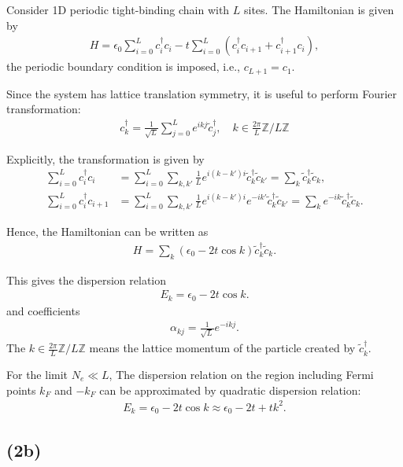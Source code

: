 \documentclass[a4paper,11pt]{article}
\begin{document}
Consider 1D periodic tight-binding chain with $L$ sites. The Hamiltonian is given by
\begin{eqnarray}
  H = \epsilon_0\sum_{i=0}^{L} c_i^\dagger c_i - t \sum_{i=0}^{L} (c_i^\dagger c_{i+1} + c_{i+1}^\dagger c_i),
\end{eqnarray}
the periodic boundary condition is imposed, i.e., $c_{L+1} = c_1$. 

Since the system has lattice translation symmetry, it is useful to perform Fourier transformation:
\begin{eqnarray}
  c_k^\dagger = \frac{1}{\sqrt{L}} \sum_{j=0}^{L} e^{ikj} \tilde{c}_j^\dagger, \quad k \in \frac{2\pi}{L}\mathbb{Z}/L\mathbb{Z}
\end{eqnarray}

Explicitly, the transformation is given by
\begin{align}
  \sum_{i=0}^{L} c_i^\dagger c_i &= \sum_{i=0}^{L} \sum_{k, k'} \frac{1}{L} e^{i(k-k')i} \tilde{c}_k^\dagger \tilde{c}_{k'} = \sum_{k} \tilde{c}_k^\dagger \tilde{c}_k,\\
  \sum_{i=0}^{L} c_i^\dagger c_{i+1} &= \sum_{i=0}^{L} \sum_{k, k'} \frac{1}{L} e^{i(k-k')i} e^{-ik'} \tilde{c}_k^\dagger \tilde{c}_{k'} = \sum_{k} e^{-ik} \tilde{c}_k^\dagger \tilde{c}_k.
\end{align}

Hence, the Hamiltonian can be written as
\begin{eqnarray}
  H = \sum_{k} (\epsilon_0 - 2t\cos k) \tilde{c}_k^\dagger \tilde{c}_k.
\end{eqnarray}

This gives the dispersion relation 
\begin{eqnarray}
  E_k = \epsilon_0 - 2t\cos k.
\end{eqnarray}
and coefficients
\begin{eqnarray}
  \alpha_{kj} = \frac{1}{\sqrt{L}} e^{-ikj}.
\end{eqnarray}
The $k\in \frac{2\pi}{L}\mathbb{Z}/L\mathbb{Z}$ means the lattice momentum of the particle created by $\tilde{c}_k^\dagger$.

For the limit $N_e \ll L$, The dispersion relation on the region including Fermi points $k_F$ and $-k_F$ can be approximated by quadratic dispersion relation:
\begin{eqnarray}
  E_k = \epsilon_0 - 2t\cos k \approx \epsilon_0 - 2t + t k^2.
\end{eqnarray}

\subsection{(2b)}
\end{document}
